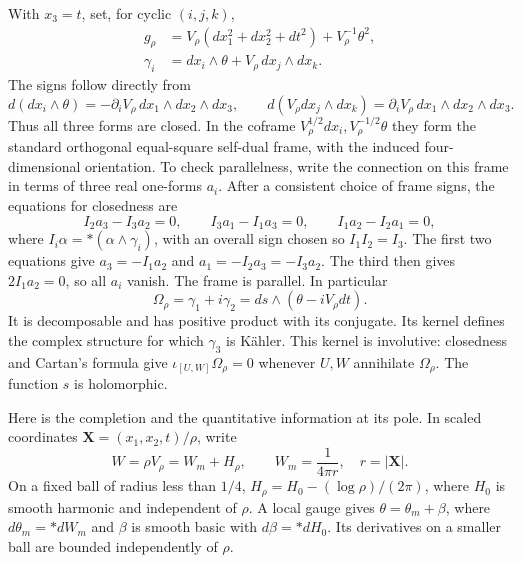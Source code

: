 With \(x_3=t\), set, for cyclic \((i,j,k)\),
\begin{equation}\label{eq:nodal-gh-triple}
 \begin{split}
 g_\rho&=V_\rho(dx_1^2+dx_2^2+dt^2)+V_\rho^{-1}\theta^2,\\
 \gamma_i&=dx_i\wedge\theta+V_\rho\,dx_j\wedge dx_k.
 \end{split}
\end{equation}
The signs follow directly from
\[
 d(dx_i\wedge\theta)=-\partial_iV_\rho\,dx_1\wedge dx_2\wedge dx_3,
 \qquad
 d(V_\rho dx_j\wedge dx_k)=\partial_iV_\rho\,dx_1\wedge dx_2\wedge dx_3.
\]
Thus all three forms are closed.  In the coframe
\(V_\rho^{1/2}dx_i,V_\rho^{-1/2}\theta\) they form the standard
orthogonal equal-square self-dual frame, with the induced
four-dimensional orientation.  To check parallelness, write the
connection on this frame in terms of three real one-forms \(a_i\).
After a consistent choice of frame signs, the equations for
closedness are
\[
 I_2a_3-I_3a_2=0,\qquad
 I_3a_1-I_1a_3=0,\qquad
 I_1a_2-I_2a_1=0,
\]
where \(I_i\alpha=*(\alpha\wedge\gamma_i)\), with an overall
sign chosen so \(I_1I_2=I_3\).
The first two equations give \(a_3=-I_1a_2\) and
\(a_1=-I_2a_3=-I_3a_2\).
The third then gives \(2I_1a_2=0\), so all \(a_i\) vanish.
The frame is parallel.
In particular
\begin{equation}\label{eq:nodal-gh-complex-form}
 \Omega_\rho=\gamma_1+i\gamma_2
       =ds\wedge(\theta-iV_\rho dt).
\end{equation}
It is decomposable and has positive product with its conjugate.
Its kernel defines the complex structure for which \(\gamma_3\)
is K\"ahler.  This kernel is involutive: closedness and Cartan's
formula give \(\iota_{[U,W]}\Omega_\rho=0\) whenever \(U,W\)
annihilate \(\Omega_\rho\).  The function \(s\) is holomorphic.

Here is the completion and the quantitative information at its pole.
In scaled coordinates \(\mathbf X=(x_1,x_2,t)/\rho\), write
\begin{equation}\label{eq:nodal-pole-split}
 W=\rho V_\rho=W_m+H_\rho,\qquad W_m=\frac1{4\pi r},\quad
 r=|\mathbf X|.
\end{equation}
On a fixed ball of radius less than \(1/4\),
\(H_\rho=H_0-(\log\rho)/(2\pi)\), where \(H_0\) is smooth harmonic
and independent of \(\rho\).
A local gauge gives \(\theta=\theta_m+\beta\), where
\(d\theta_m=*dW_m\) and \(\beta\) is smooth basic with
\(d\beta=*dH_0\).  Its derivatives on a smaller ball are bounded
independently of \(\rho\).

